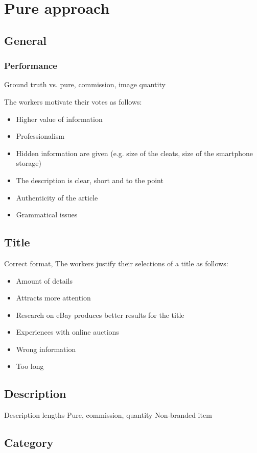 \section{Pure approach}
\subsection{General}
\subsubsection{Performance}
Ground truth vs. pure, commission, image quantity 

The workers motivate their votes as follows: 
\begin{itemize}
	\item Higher value of information 
	\item Professionalism 
	\item Hidden information are given (e.g. size of the cleats, size of the smartphone storage) 
	\item The description is clear, short and to the point 
	\item Authenticity of the article 
	\item Grammatical issues 
\end{itemize}

\subsection{Title}
Correct format, 
The workers justify their selections of a title as follows: 
\begin{itemize}
	\item Amount of details 
	\item Attracts more attention 
	\item Research on eBay produces better results for the title 
	\item Experiences with online auctions 
	\item Wrong information 
	\item Too long 
\end{itemize}

\subsection{Description}
Description lengths Pure, commission, quantity 
Non-branded item 

\subsection{Category}

